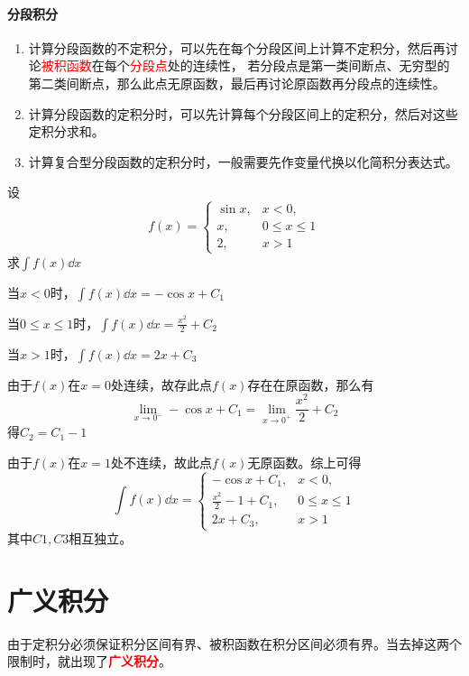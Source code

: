 \paragraph{分段积分}
\begin{enumerate}[(1)]
    \item 计算分段函数的不定积分，可以先在每个分段区间上计算不定积分，然后再讨论\textcolor{red}{被积函数}在每个\textcolor{red}{分段点}处的连续性，
          若分段点是第一类间断点、无穷型的第二类间断点，那么此点无原函数，最后再讨论原函数再分段点的连续性。
    \item 计算分段函数的定积分时，可以先计算每个分段区间上的定积分，然后对这些定积分求和。
    \item 计算复合型分段函数的定积分时，一般需要先作变量代换以化简积分表达式。
\end{enumerate}
\begin{example}
    设
    \[
        f(x) =
        \begin{cases}
            \sin x, & x<0,           \\
            x,      & 0\leq x \leq 1 \\
            2,      & x>1
        \end{cases}
    \]
    求$\displaystyle\int f(x)\dd{x}$
\end{example}
\begin{solution}
    当$x<0$时，$\displaystyle\int f(x)\dd{x} = -\cos x + C_1$

    当$0\leq x \leq 1$时，$\displaystyle\int f(x)\dd{x} = \frac{x^2}{2} + C_2$

    当$x>1$时，$\displaystyle\int f(x)\dd{x} = 2x + C_3$

    由于$f(x)$在$x=0$处连续，故存此点$f(x)$存在在原函数，那么有
    \[ \lim_{x\to 0^-} -\cos x + C_1 = \lim_{x\to 0^+} \frac{x^2}{2} + C_2 \]
    得$C_2=C_1 - 1$

    由于$f(x)$在$x=1$处不连续，故此点$f(x)$无原函数。综上可得
    \[
        \int f(x)\dd{x} =
        \begin{cases}
            -\cos x + C_1,            & x<0,           \\
            \frac{x^2}{2}  - 1 + C_1, & 0\leq x \leq 1 \\
            2x + C_3,                 & x>1
        \end{cases}
    \]
    其中$C1,C3$相互独立。
\end{solution}

\section{广义积分}
由于定积分必须保证积分区间有界、被积函数在积分区间必须有界。当去掉这两个限制时，就出现了\textcolor{red}{\textsf{\textbf{广义积分}}}。
